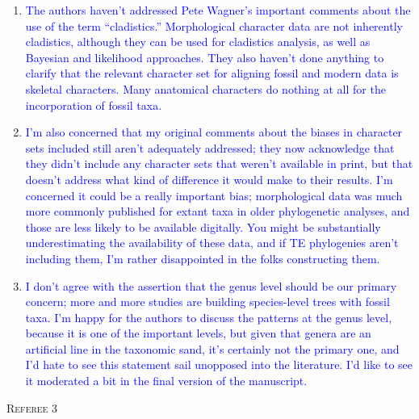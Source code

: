 \documentclass[12pt,letterpaper]{article}
\renewcommand{\section}[1]{%
\bigskip
\begin{center}
\begin{Large}
\normalfont\scshape #1
\medskip
\end{Large}
\end{center}}
\begin{document}
\begin{enumerate}
\item{\textcolor{blue}{The authors haven’t addressed Pete Wagner’s important comments about the use of the term “cladistics.” Morphological character data are not inherently cladistics, although they can be used for cladistics analysis, as well as Bayesian and likelihood approaches. They also haven’t done anything to clarify that the relevant character set for aligning fossil and modern data is skeletal characters. Many anatomical characters do nothing at all for the incorporation of fossil taxa.}}

\item{\textcolor{blue}{I’m also concerned that my original comments about the biases in character sets included still aren’t adequately addressed; they now acknowledge that they didn’t include any character sets that weren’t available in print, but that doesn’t address what kind of difference it would make to their results. I’m concerned it could be a really important bias; morphological data was much more commonly published for extant taxa in older phylogenetic analyses, and those are less likely to be available digitally. You might be substantially underestimating the availability of these data, and if TE phylogenies aren’t including them, I’m rather disappointed in the folks constructing them. }}

\item{\textcolor{blue}{I don’t agree with the assertion that the genus level should be our primary concern; more and more studies are building species-level trees with fossil taxa. I’m happy for the authors to discuss the patterns at the genus level, because it is one of the important levels, but given that genera are an artificial line in the taxonomic sand, it’s certainly not the primary one, and I’d hate to see this statement sail unopposed into the literature. I’d like to see it moderated a bit in the final version of the manuscript.}}
\end{enumerate}

\section{Referee 3}
\end{document}
